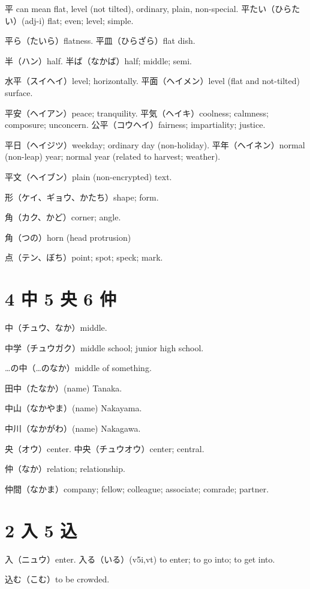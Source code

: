 平 can mean flat, level (not tilted), ordinary, plain, non-special.
平たい（ひらたい）(adj-i) flat; even; level; simple.

平ら（たいら）flatness.
平皿（ひらざら）flat dish.

半（ハン）half.
半ば（なかば）half; middle; semi.

水平（スイヘイ）level; horizontally.
平面（ヘイメン）level (flat and not-tilted) surface.

平安（ヘイアン）peace; tranquility.
平気（ヘイキ）coolness; calmness; composure; unconcern.
公平（コウヘイ）fairness; impartiality; justice.

平日（ヘイジツ）weekday; ordinary day (non-holiday).
平年（ヘイネン）normal (non-leap) year; normal year (related to harvest; weather).

平文（ヘイブン）plain (non-encrypted) text.

形（ケイ、ギョウ、かたち）shape; form.

角（カク、かど）corner; angle.

角（つの）horn (head protrusion)

点（テン、ぼち）point; spot; speck; mark.



\section{4 中 5 央 6 仲}

中（チュウ、なか）middle.

中学（チュウガク）middle school; junior high school.

…の中（…のなか）middle of something.

田中（たなか）(name) Tanaka.

中山（なかやま）(name) Nakayama.

中川（なかがわ）(name) Nakagawa.

央（オウ）center.
中央（チュウオウ）center; central.

仲（なか）relation; relationship.

仲間（なかま）company; fellow; colleague; associate; comrade; partner.

\section{2 入 5 込}

入（ニュウ）enter.
入る（いる）(v5i,vt)
to enter; to go into; to get into.

込む（こむ）to be crowded.

